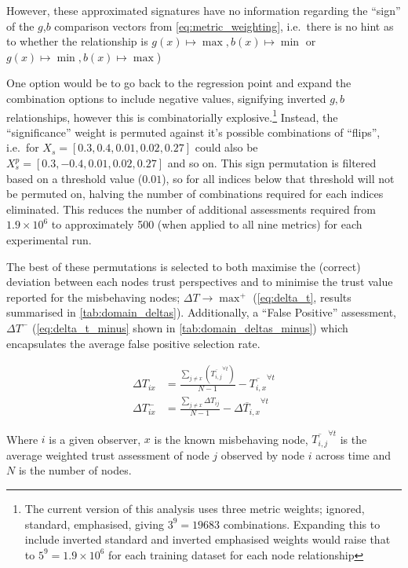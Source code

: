 However, these approximated signatures have no information regarding the ``sign'' of the  $g$,$b$ comparison vectors from \autoref{eq:metric_weighting}, i.e.\ there is no hint as to whether the relationship is $g(x) \mapsto \max, b(x) \mapsto \min$ or $g(x) \mapsto \min, b(x) \mapsto \max$)  

One option would be to go back to the regression point and expand the combination options to include negative values, signifying inverted $g,b$ relationships, however this is combinatorially explosive.\footnote{The current version of this analysis uses three metric weights; ignored, standard, emphasised, giving $3^9 = 19683$ combinations. Expanding this to include inverted standard and inverted emphasised weights would raise that to $5^9 = 1.9\times 10^6$ for each training dataset for each node relationship}
Instead, the ``significance'' weight is permuted against it's possible combinations of ``flips'', i.e.\ for $X_s=[0.3,0.4,0.01,0.02,0.27]$ could also be $X_s^p=[0.3,-0.4,0.01,0.02,0.27]$ and so on. 
This sign permutation is filtered based on a threshold value ($0.01$), so for all indices below that threshold will not be permuted on, halving the number of combinations required for each indices eliminated.
This reduces the number of additional assessments required from $1.9\times 10^6$ to approximately 500 (when applied to all nine metrics) for each experimental run.

The best of these permutations is selected to both maximise the (correct) deviation between each nodes trust perspectives and to minimise the trust value reported for the misbehaving nodes; $\Delta T \to \max^+$ (\autoref{eq:delta_t}, results summarised in \autoref{tab:domain_deltas}).
Additionally, a ``False Positive'' assessment, $\Delta T^-$ (\autoref{eq:delta_t_minus} shown in \autoref{tab:domain_deltas_minus}) which encapsulates the average false positive selection rate.

\begin{align}
  \Delta T_{ix} &= \frac{\sum_{j\neq x}\left( \overline{T_{i,j}}^{\forall t}\right)}{N-1} - \overline{T_{i,x}}^{\forall t} \label{eq:delta_t}\\
  \Delta T_{ix}^- &= \frac{\sum_{j\neq x} \Delta T_{ij}}{N-1} - \overline{\Delta T_{i,x}}^{\forall t} \label{eq:delta_t_minus} 
\end{align}

Where $i$ is a given observer, $x$ is the known misbehaving node, $\overline{T_{i,j}}^{\forall t}$ is the average weighted trust assessment of node $j$ observed by node $i$ across time and $N$ is the number of nodes.

